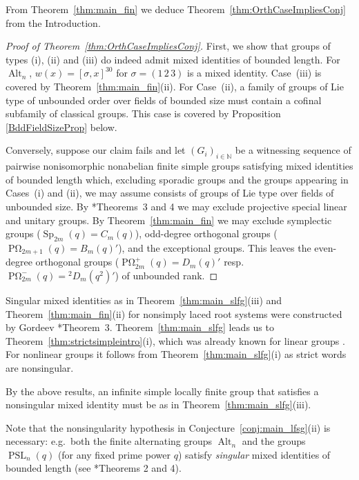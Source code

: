 \documentclass[a4paper,12pt]{amsproc}
\DeclareMathOperator{\Sp}{Sp}%
\DeclareMathOperator{\PSL}{PSL}%
\DeclareMathOperator{\POmega}{P\Omega}%
\DeclareMathOperator{\Alt}{Alt}%
\theoremstyle{plain}
\theoremstyle{definition}
\begin{document}
From Theorem~\ref{thm:main_fin} we deduce Theorem~\ref{thm:OrthCaseImpliesConj} 
from the Introduction.

\begin{proof}[Proof of Theorem~\ref{thm:OrthCaseImpliesConj}]
First, we show that groups of types (i), (ii) and (iii) do indeed 
admit mixed identities of bounded length. 
For $\Alt_n$, $w(x)=[\sigma,x] ^{30}$ for $\sigma=(1\,2\,3)$ is a mixed identity. 
Case~(iii) is covered by Theorem~\ref{thm:main_fin}(ii). 
For Case~(ii), a family of groups of Lie type of unbounded order over fields of bounded size 
must contain a cofinal subfamily of classical groups. 
This case is covered by Proposition \ref{BddFieldSizeProp} below.

Conversely, suppose our claim fails and let $(G_i)_{i\in\mathbb{N}}$ be 
a witnessing sequence of pairwise nonisomorphic 
nonabelian finite simple groups satisfying mixed identities of bounded length which, 
excluding sporadic groups and the groups appearing in Cases~(i) and (ii), 
we may assume consists of groups of Lie type over fields of unbounded size. 
By \cite{bradfordschneiderthom2023length}*{Theorems~3 and 4} we may exclude 
projective special linear and unitary groups. 
By Theorem~\ref{thm:main_fin} we may exclude symplectic groups ($\Sp_{2m}(q)=C_m(q)$), odd-degree orthogonal groups ($\POmega_{2m+1}(q)=B_m(q)'$), and the exceptional groups. 
This leaves the even-degree orthogonal groups ($\POmega_{2m}^+(q)=D_m(q)'$ resp.\ $\POmega_{2m}^-(q)={}^2D_m(q^2)'$) of unbounded rank. 
\end{proof}
    
Singular mixed identities as in Theorem~\ref{thm:main_slfg}(iii) and Theorem~\ref{thm:main_fin}(ii) for nonsimply
laced root systems were constructed by Gordeev \cite{gordeev1997freedom}*{Theorem~3}. Theorem~\ref{thm:main_slfg} leads
us to Theorem~\ref{thm:strictsimpleintro}(i), which was already known for linear groups \cite{tomanov1985generalized}. For
nonlinear groups it follows from Theorem~\ref{thm:main_slfg}(i) as strict words are nonsingular.

By the above results, an infinite simple locally finite group that satisfies a nonsingular mixed identity must be as in Theorem~\ref{thm:main_slfg}(iii).

Note that the nonsingularity hypothesis in Conjecture~\ref{conj:main_lfsg}(ii) is necessary: e.g.\ both the finite alternating groups $\Alt_n$ and the groups $\PSL_n(q)$ (for any fixed prime power $q$) satisfy \emph{singular} mixed identities of bounded length (see \cite{bradfordschneiderthom2023length}*{Theorems 2 and 4}).
\end{document}
